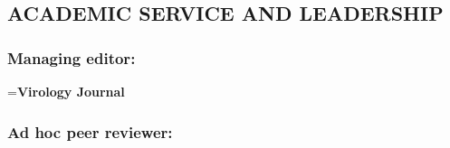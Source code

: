 \documentclass[letterpaper,10pt]{article}
\newlength{\categoryindent}
\newcommand{\categoryline}[1]{%
  {\leftskip=\categoryindent\relax\noindent #1\par}%
}
\newcommand{\journal}[1]{\textbf{#1}}
\begin{document}
\subsection*{ACADEMIC SERVICE AND LEADERSHIP}
\subsubsection*{Managing editor:}
\categoryline{\journal{Virology Journal}}

\subsubsection*{Ad hoc peer reviewer:}
\end{document}
